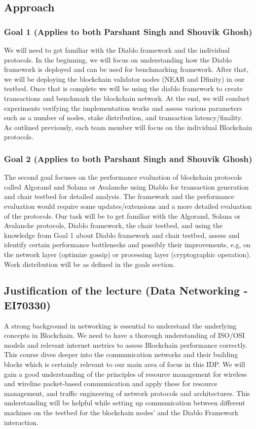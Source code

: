 \documentclass[NET,a4paper,12pt,english]{netforms}
\begin{document}
\subsection*{Approach}
\subsubsection*{Goal 1 (Applies to both Parshant Singh and Shouvik Ghosh) }
We will need to get familiar with the Diablo framework \cite{9} and the individual protocols. In the beginning, we will focus on understanding how the Diablo framework is deployed and can be used for benchmarking framework. After that, we will be deploying the blockchain validator nodes (NEAR and Dfinity) in our testbed. Once that is complete we will be using the diablo framework to create transactions and benchmark the blockchain network. At the end, we will conduct experiments verifying the implementation works and assess various parameters such as a number of nodes, stake distribution, and transaction latency/finality. As outlined previously, each team member will focus on the individual Blockchain protocols.

\subsubsection*{Goal 2 (Applies to both Parshant Singh and Shouvik Ghosh)}
The second goal focuses on the performance evaluation of blockchain protocols called Algorand and Solana or Avalanche using Diablo for transaction generation and chair testbed for detailed analysis. The framework and the performance evaluation would require some updates/extensions and a more detailed evaluation of the protocols. Our task will be to get familiar with the Algorand, Solana or Avalanche protocols, Diablo framework, the chair testbed, and using the knowledge from Goal 1 about Diablo framework and chair testbed, assess and identify certain performance bottlenecks and possibly their improvements, e.g, on the network layer (optimize gossip) or processing layer (cryptographic operation). Work distribution will be as defined in the goals section.

\subsection*{Justification of the lecture (Data Networking - EI70330)}
A strong background in networking is essential to understand the underlying concepts in Blockchain. We need to have a thorough understanding of ISO/OSI models and relevant internet metrics to assess Blockchain performance correctly. This course dives deeper into the communication networks and their building blocks which is certainly relevant to our main area of focus in this IDP. We will gain a good understanding of the principles of resource management for wireless and wireline packet-based communication and apply these for resource management, and traffic engineering of network protocols and architectures. This understanding will be helpful while setting up communication between different machines on the testbed for the blockchain nodes' and the Diablo Framework interaction.
\end{document}
